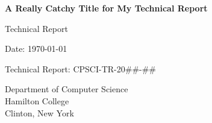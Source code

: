\documentclass[../techreport.tex]{subfiles}
\begin{document}
\pagestyle{empty}

\begin{titlepage}

	\begin{center}\large

\vspace*{2cm}


		{\bfseries{\Large{A Really Catchy Title for My Technical Report}}}

		\vspace*{1.20cm}

		Technical Report
		\vspace*{4.0mm}

		\theauthors

		\vspace*{4.0mm}

		Date: \today 


		\vspace*{6.20cm}

        Technical Report: CPSCI-TR-20\#\#-\#\#


		\vspace*{4mm}
		Department of Computer Science \\
		Hamilton College\\
		Clinton, New York

	\end{center}

\end{titlepage}
\end{document}
